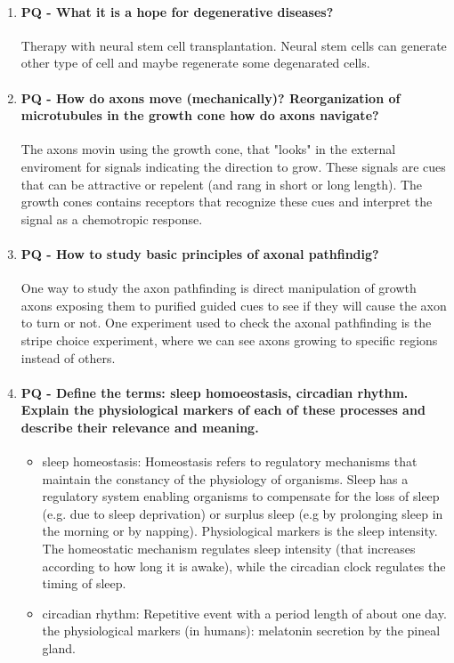 \documentclass[12pt,article,oneside,a4paper]{memoir}
\begin{document}
\begin{enumerate}
\item \paragraph{PQ - What it is a hope for degenerative diseases?} Therapy with neural stem cell transplantation. Neural stem cells can generate other type of cell and maybe regenerate some degenarated cells.

\item \paragraph{PQ - How do axons move (mechanically)? Reorganization of microtubules in the growth cone how do axons navigate?}
The axons movin using the growth cone, that "looks" in the external enviroment for signals indicating the direction to grow. These signals are cues that can be attractive or repelent (and rang in short or long length). The growth cones contains receptors that recognize these cues and interpret the signal as a chemotropic response.

\item \paragraph{PQ - How to study basic principles of axonal pathfindig?}
One way to study the axon pathfinding is direct manipulation of growth axons exposing them to purified guided cues to see if they will cause the axon to turn or not. One experiment used to check the axonal pathfinding is the stripe choice experiment, where we can see axons growing to specific regions instead of others.

\item \paragraph{PQ - Define the terms: sleep homoeostasis, circadian rhythm. Explain the physiological markers of each of these processes and describe their relevance and meaning.} 
\begin{itemize}
\item sleep homeostasis: Homeostasis refers to regulatory mechanisms that maintain the constancy of the physiology of organisms. Sleep has a regulatory system enabling organisms to compensate for the loss of sleep (e.g. due to sleep deprivation) or surplus sleep (e.g by prolonging sleep in the morning or by napping). Physiological markers is the sleep intensity. The homeostatic mechanism regulates sleep intensity (that increases according to how long it is awake), while the circadian clock regulates the timing of sleep.
\item circadian rhythm: Repetitive event with a period length of about one day. the physiological markers (in humans): melatonin secretion by the pineal gland.
\end{itemize}
\end{enumerate}
\end{document}
